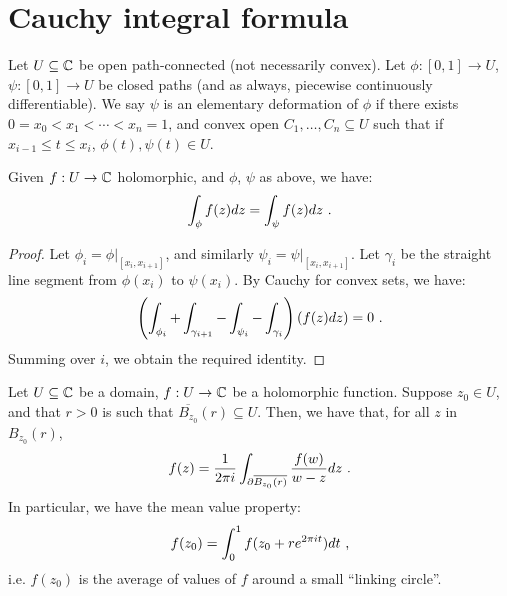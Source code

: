 
\section{Cauchy integral formula}

\begin{definition}
  Let $U \subseteq \mathbb{C}$ be open path-connected (not necessarily convex).
Let $\phi : [0, 1] \rightarrow U$, $\psi : [0, 1] \rightarrow U$ be closed paths (and as always, piecewise continuously differentiable).
We say $\psi$ is an elementary deformation of $\phi$ if there exists $0 = x_0 < x_1 < \dotsb < x_n = 1$, and convex open $C_1, \dotsc, C_n \subseteq U$ such that if $x_{i-1} \leq t \leq x_i$, $\phi(t), \psi(t) \in U$.
\end{definition}

\begin{proposition}
  Given $f : U \rightarrow \mathbb{C}$ holomorphic, and $\phi$, $\psi$ as above, we have:
\[
\int_\phi f(z)dz = \int_\psi f(z)dz \ \text{.}
\]
\end{proposition}

\begin{proof}
  Let $\phi_i = \phi\vert_{[x_i, x_{i+1}]}$, and similarly $\psi_i = \psi\vert_{[x_i, x_{i+1}]}$. Let $\gamma_i$ be the straight line segment from $\phi(x_i)$ to $\psi(x_i)$. By Cauchy for convex sets, we have:
\[
\left(\int_{\phi_i} + \int_{\gamma_{i+1}} - \int_{\psi_i} - \int_{\gamma_i}\right)\left(f(z)dz\right) = 0 \ \text{.}
\]
Summing over $i$, we obtain the required identity.
\end{proof}

\begin{theorem}[name=Cauchy integral formula,label=thm:cauchy_integral]
Let $U \subseteq \mathbb{C}$ be a domain, $f : U \rightarrow \mathbb{C}$ be a holomorphic function.
Suppose $z_0 \in U$, and that $r > 0$ is such that $\overline{B_{z_0}}(r) \subseteq U$. Then, we have that, for all $z$ in $B_{z_0}(r)$,
\[
 f(z) = \frac{1}{2\pi{}i} \int_{\partial \overline{B_{z_0}(r)}} \frac{f(w)}{w - z} dz \ \text{.}
\]
In particular, we have the mean value property:
\[
f(z_0) = \int_0^1 f(z_0 + re^{2\pi{}it}) dt \ \text{,}
\]
i.e. $f(z_0)$ is the average of values of $f$ around a small ``linking circle''.
\end{theorem}

